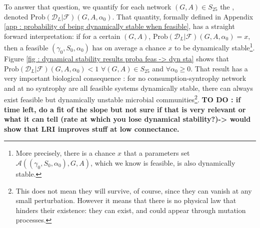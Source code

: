 \documentclass[12pt, titlepage]{report}
\begin{document}
To answer that question, we quantify for each network $(G,A) \in S_{25}$ the , denoted $\text{Prob}\left(\mathcal{D}_L | \mathcal{F}\right)(G,A, \alpha_0)$. That quantity, formally defined in Appendix \ref{app : probability of being dynamically stable when feasible}, has a straight forward interpretation:
if for a certain $(G,A)$, $\text{Prob}\left(\mathcal{D}_L | \mathcal{F}\right)(G,A, \alpha_0)=x$, then a feasible $(\gamma_0, S_0, \alpha_0)$ has on average a chance $x$ to be dynamically stable\footnote{More precisely, there is a chance $x$ that a parameters set $\mathcal{A}\left((\gamma_0, S_0, \alpha_0), G, A\right)$, which we know is feasible, is also dynamically stable.}. Figure \ref{fig : dynamical stability results proba feas -> dyn sta} shows that $\text{Prob}\left(\mathcal{D}_L | \mathcal{F}\right)(G,A, \alpha_0)< 1$ $\forall (G, A) \in S_{25}$ and $\forall \alpha_0 \geq 0$. That result has a very important biological consequence : for no consumption-syntrophy network and at no syntrophy are all feasible systems dynamically stable, \ie there can always exist feasible but dynamically unstable microbial communities\footnote{This does not mean they will survive, of course, since they can vanish at any small perturbation. However it means that there is no physical law that hinders their existence: they can exist, and could appear \eg through mutation processes.}. \textbf{TO DO : if time left, do a fit of the slope but not sure if that is very relevant or what it can tell (rate at which you lose dynamical stability?)-> would show that LRI improves stuff at low connectance.}

\end{document}
